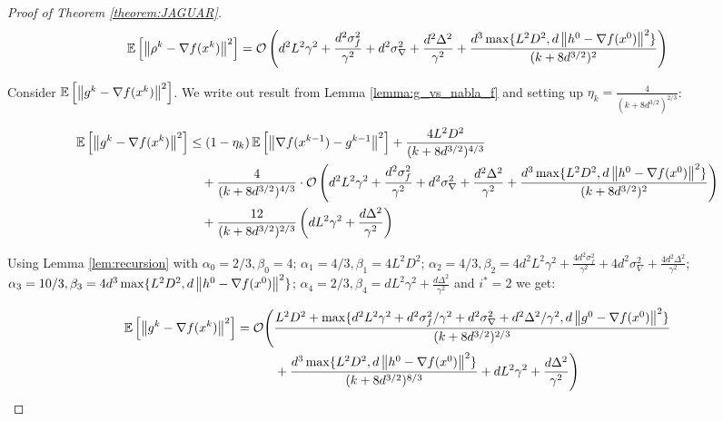 \begin{proof}[Proof of Theorem \ref{theorem:JAGUAR}]
        \begin{equation*}
            \mathbb{E}\left[ \left\| \rho^{k} - \nabla f(x^{k}) \right\|^2 \right] = 
            \mathcal{O} \left( d^2 L^2 \gamma^2 
            + \frac{d^2 \sigma_f^2}{\gamma^2} 
            + d^2 \sigma_{\nabla}^2 + \frac{d^2 \Delta^2}{\gamma^2}
            +\frac{d^3 \max\{L^2 D^2, d \left\| h^0 - \nabla f(x^0) \right\|^2\}}{(k + 8d^{3/2})^2} \right)
        \end{equation*}

        Consider $\mathbb{E}\left[ \left\| g^k - \nabla f(x^k) \right\|^2 \right]$. We write out result from Lemma \ref{lemma:g_vs_nabla_f} and setting up $\eta_k = \frac{4}{(k + 8d^{3/2})^{2/3}}$:

        \begin{equation*}
        \begin{split}
            \mathbb{E}\left[ \left\| g^k - \nabla f(x^k) \right\|^2 \right]
            &\leq 
            \left(1 - \eta_k\right) \mathbb{E}\left[ \left\| \nabla f(x^{k-1}) - g^{k-1} \right\|^2 \right]
            +
            \frac{4 L^2 D^2}{(k + 8d^{3/2})^{4/3}}
            \\&\quad+
            \frac{4}{(k + 8d^{3/2})^{4/3}} \cdot \mathcal{O} \left(d^2 L^2 \gamma^2 
            + \frac{d^2 \sigma_f^2}{\gamma^2} 
            + d^2 \sigma_{\nabla}^2 + \frac{d^2 \Delta^2}{\gamma^2}
            +\frac{d^3 \max\{L^2 D^2, d \left\| h^0 - \nabla f(x^0) \right\|^2\}}{(k + 8d^{3/2})^2} \right)
            \\&\quad+
            \frac{12}{(k + 8d^{3/2})^{2/3}} \left( d L^2 \gamma^2  
            + \frac{d \Delta^2}{\gamma^2}\right)
        \end{split}
        \end{equation*}

        Using Lemma \ref{lem:recursion} with $\alpha_0 = 2/3, \beta_0 = 4$; 
        $\alpha_1 = 4/3, \beta_1 = 4 L^2 D^2$; 
        $\alpha_2 = 4/3, \beta_2 = 4 d^2 L^2 \gamma^2 + \frac{4 d^2 \sigma_f^2}{\gamma^2} + 4 d^2 \sigma_{\nabla}^2 + \frac{4 d^2 \Delta^2}{\gamma^2}$;
        $\alpha_3 = 10/3, \beta_3 = 4 d^3 \max\{L^2 D^2, d \left\| h^0 - \nabla f(x^0) \right\|^2\}$;
        $\alpha_4 = 2/3, \beta_4 = d L^2 \gamma^2 + \frac{d \Delta^2}{\gamma^2}$ and $i^* = 2$ we get:

        \begin{equation}
        \label{eq:tmp_last_1}
        \begin{split}
            \mathbb{E}\left[ \left\| g^k - \nabla f(x^k) \right\|^2 \right] 
            &= 
            \mathcal{O} \Bigg(\frac{L^2 D^2 + \max\{d^2 L^2 \gamma^2 + d^2 \sigma_f^2/ \gamma^2 + d^2 \sigma_{\nabla}^2 + d^2 \Delta^2 / \gamma^2, d \left\| g^0 - \nabla f(x^0) \right\|^2\}}{(k + 8d^{3/2})^{2/3}} 
            \\&\qquad \quad+
            \frac{d^3 \max\{L^2 D^2, d \left\| h^0 - \nabla f(x^0) \right\|^2\}}{(k + 8d^{3/2})^{8/3}} + d L^2 \gamma^2 + \frac{d \Delta^2}{\gamma^2} \Bigg)
        \end{split}
        \end{equation}


\end{proof}
